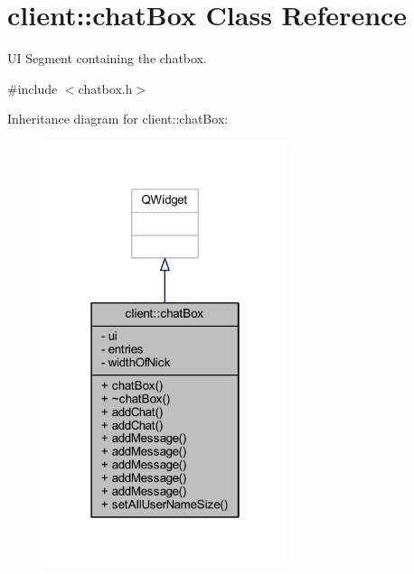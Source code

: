 \hypertarget{classclient_1_1chat_box}{\section{client\-:\-:chat\-Box Class Reference}
\label{da/d72/classclient_1_1chat_box}
}


U\-I Segment containing the chatbox.  




{\ttfamily \#include $<$chatbox.\-h$>$}



Inheritance diagram for client\-:\-:chat\-Box\-:\nopagebreak
\begin{figure}[H]
\begin{center}
\leavevmode
\includegraphics[width=202pt]{df/d2e/classclient_1_1chat_box__inherit__graph}
\end{center}
\end{figure}


